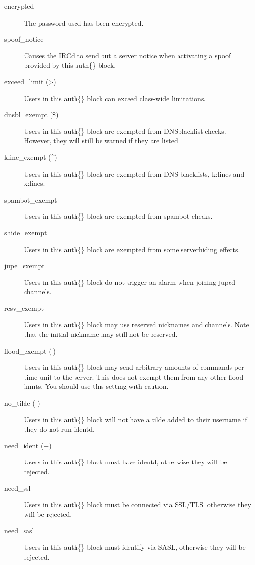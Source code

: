 \noindent
\begin{description}
\item[{encrypted}]
	The password used has been encrypted.

\item[{spoof\_notice}]
	Causes the IRCd to send out a server notice when activating a spoof
	provided by this auth\{\} block.

\item[{exceed\_limit (>{})}]
	Users in this auth\{\} block can exceed class-{}wide limitations.

\item[{dnsbl\_exempt (\$)}]
	Users in this auth\{\} block are exempted from DNSblacklist checks.
	However, they will still be warned if they are listed.

\item[{kline\_exempt (\^{})}]
	Users in this auth\{\} block are exempted from DNS blacklists, k:lines
	and x:lines.

\item[{spambot\_exempt}]
	Users in this auth\{\} block are exempted from spambot checks.

\item[{shide\_exempt}]
	Users in this auth\{\} block are exempted from some serverhiding
	effects.

\item[{jupe\_exempt}]
	Users in this auth\{\} block do not trigger an alarm when joining
	juped channels.

\item[{resv\_exempt}]
	Users in this auth\{\} block may use reserved nicknames and channels. Note
	that the initial nickname may still not be reserved.

\item[{flood\_exempt (|)}]
	Users in this auth\{\} block may send arbitrary amounts of commands per
	time unit to the server. This does not exempt them from any other flood
	limits.	You should use this setting with caution.

\item[{no\_tilde (-{})}]
	Users in this auth\{\} block will not have a tilde added to their
	username if they do not run identd.

\item[{need\_ident (+)}]
	Users in this auth\{\} block must have identd, otherwise they will be
	rejected.

\item[{need\_ssl}]
	Users in this auth\{\} block must be connected via SSL/TLS, otherwise
	they will be rejected.

\item[{need\_sasl}]
	Users in this auth\{\} block must identify via SASL, otherwise they
	will be rejected.
\end{description}


